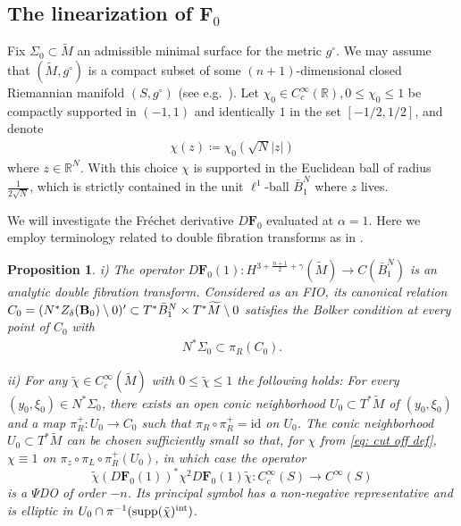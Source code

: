 \documentclass[11pt]{amsart}
\newtheorem{Proposition}[Theorem]{Proposition}
\theoremstyle{definition}
\numberwithin{equation}{section}
\newcommand{\mR}{\mathbb{R}}                    %
\newcommand{\abs}[1]{\lvert #1 \rvert}          %
\newcommand{\supp}{\mathrm{supp}}
\begin{document}
\subsection{The linearization of $\mathbf{F}_0$}\label{subsec:linF0}

Fix $\Sigma_0\subset \widetilde{M}$ an admissible minimal surface for the metric $g^\circ$. %
We may assume that $(\widetilde{M},g^\circ)$ is a compact subset of some $(n+1)$-dimensional closed Riemannian manifold $(S,g^\circ)$ (see e.g.\ \cite[Thm.~3.1.8]{zbMATH07625517}). 
Let $\chi_0 \in C_c^\infty(\mR), 0\leq \chi_0\leq 1$ be compactly supported in $(-1,1)$ and identically $1$ in the set $[-1/2,1/2]$, and denote 
\begin{eqnarray}\label{eq: cut off def}
\chi(z) \coloneqq \chi_0(\sqrt{N} \abs{z})
\end{eqnarray}
where $z\in \mathbb R^{N}$. With this choice $\chi$ is supported in the Euclidean ball of radius $\frac{1}{2\sqrt{N}}$, which is strictly contained in the unit $\ell^1$-ball $\bar{B}_1^{N}$ where $z$ lives.

We will investigate the Fr\'echet derivative $D\mathbf{F}_0$ evaluated at $\alpha =1$. Here we employ terminology related to double fibration transforms as in \cite{MST}.

\begin{Proposition}\label{prop:ellonset}
	i) The operator $D\mathbf{F}_0(1)\colon H^{3+\frac{n+1}{2}+\gamma}(\widetilde{M}) \to C(\bar{B}_1^{N})$ is an analytic double fibration transform. Considered as an FIO, its canonical relation $C_0 = (N^*Z_\delta({\bf B}_0)\setminus 0)'\subset T^* \bar{B}_1^{N}\times T^* \widetilde{M}\setminus 0$ satisfies the Bolker condition at every point of $C_0$ with
    \begin{eqnarray}
        \label{eq: projection contains}
        N^\ast \Sigma_0 \subset \pi_R(C_0).
    \end{eqnarray}
    
    
    ii) For any $\tilde{\chi} \in C_c^\infty(\widetilde{M})$ with $0\leq \tilde{\chi}\leq 1$ 
	the following holds:
For every $(y_0,\xi_0) \in N^\ast \Sigma_0$, there exists an open conic neighborhood $U_0 \subset T^\ast \widetilde{M}$ of $(y_0,\xi_0)$ and a map $\pi_R^{+}\colon U_0 \to C_0$ such that $\pi_R\circ \pi_R^+ = \mathrm{id}$ on $U_0$. The conic neighborhood $U_0 \subset T^*\widetilde{M}$ can be chosen sufficiently small so that, for $\chi$ from \eqref{eq: cut off def}, $\chi \equiv 1$ on $\pi_z \circ\pi_L\circ \pi_R^+(U_0)$, in which case the operator
	\begin{equation}\label{eq:definepsido}
		\tilde{\chi}(D\mathbf{F}_0(1))^\ast \chi^2 D\mathbf{F}_0(1)\tilde{\chi} \colon C_c^\infty(S)\to C^\infty(S)
	\end{equation}
	is a $\Psi$DO of order $-n$. Its principal symbol has a non-negative representative and is 
    elliptic in $U_0\cap \pi^{-1}(\supp(\tilde \chi)^{\rm int})$.
\end{Proposition}
\end{document}
